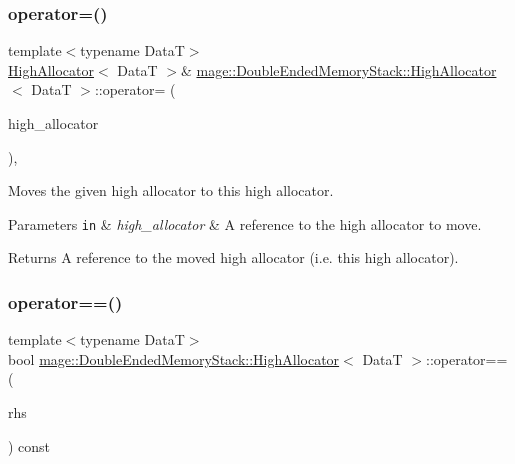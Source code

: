 \subsubsection{\texorpdfstring{operator=()}{operator=()}\hspace{0.1cm}{\footnotesize\ttfamily [2/2]}}
{\footnotesize\ttfamily template$<$typename DataT$>$ \\
\hyperlink{structmage_1_1_double_ended_memory_stack_1_1_high_allocator}{High\+Allocator}$<$ DataT $>$\& \hyperlink{structmage_1_1_double_ended_memory_stack_1_1_high_allocator}{mage\+::\+Double\+Ended\+Memory\+Stack\+::\+High\+Allocator}$<$ DataT $>$\+::operator= (\begin{DoxyParamCaption}\item[{\hyperlink{structmage_1_1_double_ended_memory_stack_1_1_high_allocator}{High\+Allocator}$<$ DataT $>$ \&\&}]{high\+\_\+allocator }\end{DoxyParamCaption})\hspace{0.3cm}{\ttfamily [delete]}, {\ttfamily [noexcept]}}

Moves the given high allocator to this high allocator.


\begin{DoxyParams}[1]{Parameters}
\mbox{\tt in}  & {\em high\+\_\+allocator} & A reference to the high allocator to move. \\
\hline
\end{DoxyParams}
\begin{DoxyReturn}{Returns}
A reference to the moved high allocator (i.\+e. this high allocator). 
\end{DoxyReturn}
\hypertarget{structmage_1_1_double_ended_memory_stack_1_1_high_allocator_a1cc9124a1c31f2162a67662ee996dff4}{}\label{structmage_1_1_double_ended_memory_stack_1_1_high_allocator_a1cc9124a1c31f2162a67662ee996dff4} 
\subsubsection{\texorpdfstring{operator==()}{operator==()}}
{\footnotesize\ttfamily template$<$typename DataT$>$ \\
bool \hyperlink{structmage_1_1_double_ended_memory_stack_1_1_high_allocator}{mage\+::\+Double\+Ended\+Memory\+Stack\+::\+High\+Allocator}$<$ DataT $>$\+::operator== (\begin{DoxyParamCaption}\item[{const \hyperlink{structmage_1_1_double_ended_memory_stack_1_1_high_allocator}{High\+Allocator}$<$ DataT $>$ \&}]{rhs }\end{DoxyParamCaption}) const\hspace{0.3cm}{\ttfamily [noexcept]}}

